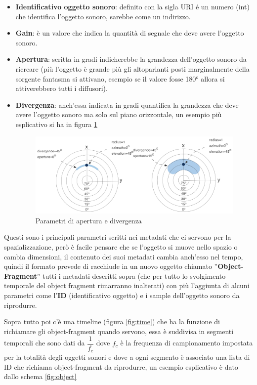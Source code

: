 \documentclass[12pt,a4paper]{report}
\begin{document}
\begin{itemize}
\item \textbf{Identificativo oggetto sonoro}: definito con la sigla URI é un numero (int) che identifica l'oggetto sonoro, sarebbe come un indirizzo.
\item \textbf{Gain}: è un valore che indica la quantità di segnale che deve avere l'oggetto sonoro.
\item \textbf{Apertura}: scritta in gradi indicherebbe la grandezza dell'oggetto sonoro da ricreare (più l'oggetto è grande più gli altoparlanti posti marginalmente della sorgente fantasma si attivano, esempio se il valore fosse 180° allora si attiverebbero tutti i diffusori).
\item \textbf{Divergenza}: anch'essa indicata in gradi quantifica la grandezza che deve avere l'oggetto sonoro ma solo sul piano orizzontale, un esempio più esplicativo si ha in figura \ref{fig:apertura}

	\begin{figure}[htbp]
	\centering
	\includegraphics[scale=0.35]{figures/apertura.png}
	\caption {Parametri di apertura e divergenza}
	\label{fig:apertura}
	\end{figure}


\end{itemize}

Questi sono i principali parametri scritti nei metadati che ci servono per la spazializzazione, però è facile pensare che se l'oggetto si muove nello spazio o cambia dimensioni, il contenuto dei suoi metadati cambia anch'esso nel tempo, quindi il formato prevede di racchiude in un nuovo oggetto chiamato ''\textbf{Object-Fragment}'' tutti i metadati descritti sopra (che per tutto lo svolgimento temporale del object fragment rimarranno inalterati) con più l'aggiunta di alcuni parametri come l'\textbf{ID} (identificativo oggetto) e i sample dell'oggetto sonoro da riprodurre.

Sopra tutto poi c'è una timeline (figura \ref{fig:time}) che ha la funzione di richiamare gli object-fragment quando servono, essa è suddivisa in segmenti temporali che sono dati da $\dfrac{1}{f_c}$ dove $f_c$ è la frequenza di campionamento impostata per la totalità degli oggetti sonori e dove a ogni segmento è associato una lista di ID che richiama object-fragment da riprodurre, un esempio esplicativo è dato dallo schema \ref{fig:object}
\end{document}
